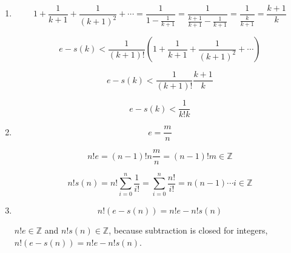 \documentclass[12pt,letterpaper]{article}
\begin{document}
\begin{enumerate}
{\begin{enumerate}
{$$ e - s(k) < \frac 1 {(k+1)!} \left( 1 + \frac 1 {k+1} + \frac 1{(k+1)^2} + \cdots \right)$$
}

\item {
$$ 1 + \frac 1 {k+1} + \frac 1{(k+1)^2} + \cdots = \frac 1 {1 - \frac 1 {k+1}} = \frac 1 {\frac {k+1} {k+1} - \frac 1 {k+1}} = \frac 1 {\frac k {k + 1}} = \frac {k+1} k$$

$$ e - s(k) < \frac 1 {(k+1)!} \left( 1 + \frac 1 {k+1} + \frac 1{(k+1)^2} + \cdots \right)$$

$$ e - s(k) < \frac 1 {(k+1)!} \frac {k+1} k $$

$$ e - s(k) < \frac 1 {k!k} $$
}

\item {
$$ e = \frac m n$$

$$ n! e = (n-1)! n \frac m n = (n - 1)! m \in \mathbb{Z} $$

$$ n! s(n) = n! \sum_{i=0}^n \frac 1 {i!}  = \sum_{i=0}^n \frac {n!} {i!} = n (n - 1) \cdots i \in \mathbb{Z}$$
}

\item {
$$ n! (e - s(n)) = n!e - n!s(n)$$

$n!e \in \mathbb{Z}$ and $n!s(n) \in \mathbb{Z}$, because subtraction is closed for integers, $ n! (e - s(n)) = n!e - n!s(n)$.
}
\end{enumerate}
}

\end{enumerate}
\end{document}

